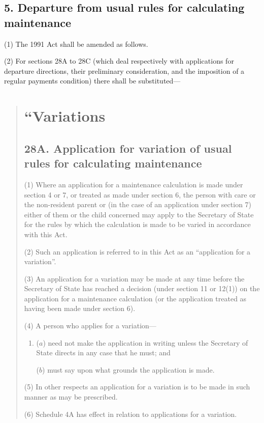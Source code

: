 \documentclass[12pt,a4paper]{article}
\begin{document}
\subsection{5. Departure from usual rules for calculating maintenance}

(1) The 1991 Act shall be amended as follows.

(2) For sections 28A to 28C (which deal respectively with applications for departure directions, their preliminary consideration, and the imposition of a regular payments condition) there shall be substituted—
\begin{quotation}
\section*{“Variations}

\subsection*{28A. Application for variation of usual rules for calculating maintenance}

(1) Where an application for a maintenance calculation is made under section 4 or 7, or treated as made under section 6, the person with care or the non-resident parent or (in the case of an application under section 7) either of them or the child concerned may apply to the Secretary of State for the rules by which the calculation is made to be varied in accordance with this Act.

(2) Such an application is referred to in this Act as an “application for a variation”.

(3) An application for a variation may be made at any time before the Secretary of State has reached a decision (under section 11 or 12(1)) on the application for a maintenance calculation (or the application treated as having been made under section 6).

(4) A person who applies for a variation—
\begin{enumerate}\item[]
($a$) need not make the application in writing unless the Secretary of State directs in any case that he must; and

($b$) must say upon what grounds the application is made.
\end{enumerate}

(5) In other respects an application for a variation is to be made in such manner as may be prescribed.

(6) Schedule 4A has effect in relation to applications for a variation.


\end{quotation}
\end{document}
